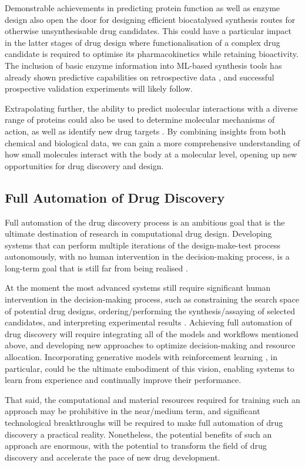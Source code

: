 Demonstrable achievements in predicting protein function \cite{Bileschi2022ProteinAnnotation} as well as enzyme design \cite{Yeh2023DeNovoLuciferase} also open the door for designing efficient biocatalysed synthesis routes for otherwise unsynthesisable drug candidates. This could have a particular impact in the latter stages of drug design where functionalisation of a complex drug candidate is required to optimise its pharmacokinetics while retaining bioactivity. The inclusion of basic enzyme information into ML-based synthesis tools has already shown predictive capabilities on retrospective data \cite{Probst2022Biocatalysis}, and successful prospective validation experiments will likely follow.

Extrapolating further, the ability to predict molecular interactions with a diverse range of proteins could also be used to determine molecular mechanisms of action, as well as identify new drug targets \cite{Schenone2013TargetID}. By combining insights from both chemical and biological data, we can gain a more comprehensive understanding of how small molecules interact with the body at a molecular level, opening up new opportunities for drug discovery and design.

\subsection{Full Automation of Drug Discovery}
Full automation of the drug discovery process is an ambitious goal that is the ultimate destination of research in computational drug design. Developing systems that can perform multiple iterations of the design-make-test process autonomously, with no human intervention in the decision-making process, is a long-term goal that is still far from being realised \cite{Coley2019AutonomousProgress, Coley2019AutonomousOutlook, Schneider2018AutomatingDrugDiscovery}.

At the moment the most advanced systems still require significant human intervention in the decision-making process, such as constraining the search space of potential drug designs, ordering/performing the synthesis/assaying of selected candidates, and interpreting experimental results \cite{Goldman2022ChemicalDesignLevels}. Achieving full automation of drug discovery will require integrating all of the models and workflows mentioned above, and developing new approaches to optimize decision-making and resource allocation. Incorporating generative models with reinforcement learning \cite{Popova2018DeepRL, Zhou2019Optimization, born2019paccmannrl, Chenthamarakshan2022IBMGenCoV}, in particular, could be the ultimate embodiment of this vision, enabling systems to learn from experience and continually improve their performance.

That said, the computational and material resources required for training such an approach may be prohibitive in the near/medium term, and significant technological breakthroughs will be required to make full automation of drug discovery a practical reality. Nonetheless, the potential benefits of such an approach are enormous, with the potential to transform the field of drug discovery and accelerate the pace of new drug development.

